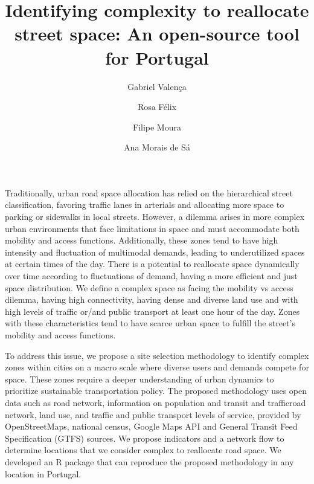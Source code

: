\documentclass[review, 3p,
authoryear]{elsarticle} %
\begin{document}
\begin{frontmatter}

  \title{Identifying complexity to reallocate street space: An
open-source tool for Portugal}
    \author[CERIS]{Gabriel Valença%
  }
    \author[CERIS]{Rosa Félix%
  }
  
    \author[CERIS]{Filipe Moura%
  }
  
    \author[CITUA]{Ana Morais de Sá%
  }
  
  
  \begin{abstract}
  
  \end{abstract}
  
 \end{frontmatter}

Traditionally, urban road space allocation has relied on the
hierarchical street classification, favoring traffic lanes in arterials
and allocating more space to parking or sidewalks in local streets.
However, a dilemma arises in more complex urban environments that face
limitations in space and must accommodate both mobility and access
functions. Additionally, these zones tend to have high intensity and
fluctuation of multimodal demands, leading to underutilized spaces at
certain times of the day. There is a potential to reallocate space
dynamically over time according to fluctuations of demand, having a more
efficient and just space distribution. We define a complex space as
facing the mobility vs access dilemma, having high connectivity, having
dense and diverse land use and with high levels of traffic or/and public
transport at least one hour of the day. Zones with these characteristics
tend to have scarce urban space to fulfill the street's mobility and
access functions.

To address this issue, we propose a site selection methodology to
identify complex zones within cities on a macro scale where diverse
users and demands compete for space. These zones require a deeper
understanding of urban dynamics to prioritize sustainable transportation
policy. The proposed methodology uses open data such as road network,
information on population and transit and trafficroad network, land use,
and traffic and public transport levels of service, provided by
OpenStreetMaps, national census, Google Maps API and General Transit
Feed Specification (GTFS) sources. We propose indicators and a network
flow to determine locations that we consider complex to reallocate road
space. We developed an R package that can reproduce the proposed
methodology in any location in Portugal.
\end{document}

